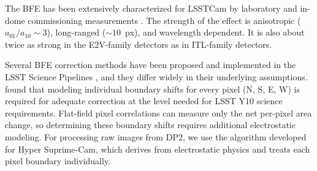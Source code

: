 The BFE has been extensively characterized for LSSTCam by laboratory and in-dome commissioning measurements \citep{2024PASP..136d5003B}.
The strength of the effect is anisotropic ($a_{01}/a_{10} \sim 3$), long-ranged ($\sim 10$~px), and wavelength dependent.
It is also about twice as strong in the E2V-family detectors as in ITL-family detectors.

Several BFE correction methods have been proposed and implemented in the LSST Science Pipelines \citep{2015JInst..10C5032G,2018AJ....155..258C,2023A&A...670A.118A,2024PASP..136d5003B}, and they differ widely in their underlying assumptions.
\citet{2024PASP..136d5003B} found that modeling individual boundary shifts for every pixel (N, S, E, W) is required for adequate correction at the level needed for LSST Y10 science requirements.
Flat-field pixel correlations can measure only the net per-pixel area change, so determining these boundary shifts requires additional electrostatic modeling.
For processing raw images from DP2, we use the \citet{2023A&A...670A.118A} algorithm developed for Hyper Suprime-Cam, which derives from electrostatic physics and treats each pixel boundary individually.


